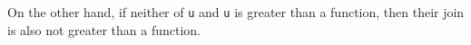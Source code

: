 \begin{fence}
\begin{code}
\\
\>[.][@{}l@{}]\<[260I]%
\>[4]\AgdaSpace{}%
\AgdaSpace{}%
\<%
\\
\>[0]%
\>[280I]\AgdaSymbol{|}\AgdaSpace{}%
\AgdaSpace{}%
\AgdaSpace{}%
\AgdaOperator{\AgdaInductiveConstructor{,}}\AgdaSpace{}%
\AgdaSpace{}%
\AgdaSpace{}%
\AgdaOperator{\AgdaInductiveConstructor{,}}\AgdaSpace{}%
\AgdaSpace{}%
\AgdaSpace{}%
\<%
\\
\>[.][@{}l@{}]\<[280I]%
\>[4]\AgdaSpace{}%
\AgdaSpace{}%
\<%
\\
\>[0]\AgdaSpace{}%
\AgdaSymbol{|}\AgdaSpace{}%
\AgdaSpace{}%
\AgdaSpace{}%
\AgdaSymbol{=}\AgdaSpace{}%
\AgdaSpace{}%
\AgdaSpace{}%
\AgdaSpace{}%
\AgdaOperator{\AgdaInductiveConstructor{,}}\AgdaSpace{}%
\AgdaSpace{}%
\AgdaSpace{}%
\AgdaOperator{\AgdaInductiveConstructor{,}}\AgdaSpace{}%
\AgdaSymbol{(}\AgdaSpace{}%
\AgdaSymbol{)}\AgdaSpace{}%
\AgdaSpace{}%
\<%
\\
\>[0]\AgdaSpace{}%
\AgdaSymbol{|}\AgdaSpace{}%
\AgdaSpace{}%
\AgdaSpace{}%
\AgdaSymbol{=}\AgdaSpace{}%
\AgdaSpace{}%
\AgdaSpace{}%
\AgdaSpace{}%
\AgdaOperator{\AgdaInductiveConstructor{,}}\AgdaSpace{}%
\AgdaSpace{}%
\AgdaSpace{}%
\AgdaOperator{\AgdaInductiveConstructor{,}}\AgdaSpace{}%
\AgdaSymbol{(}\AgdaSpace{}%
\AgdaSymbol{)}\AgdaSpace{}%
\AgdaSpace{}%
\<%
\end{code}
\end{fence}

On the other hand, if neither of \texttt{u} and
\texttt{u\textquotesingle{}} is greater than a function, then their join
is also not greater than a function.

